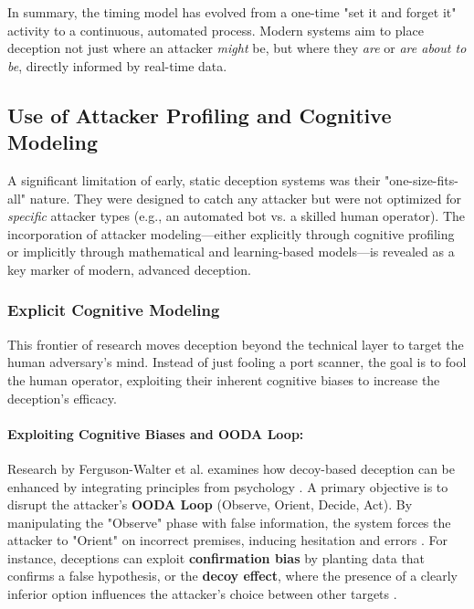 In summary, the timing model has evolved from a one-time "set it and forget it" activity to a continuous,
automated process. Modern systems aim to place deception not just where an attacker \textit{might} be, but
where they \textit{are} or \textit{are about to be}, directly informed by real-time data.

\subsection{Use of Attacker Profiling and Cognitive Modeling}\label{cognitive modeling}

A significant limitation of early, static deception systems was their "one-size-fits-all" nature. They were
designed to catch any attacker but were not optimized for \textit{specific} attacker types (e.g., an automated
bot vs. a skilled human operator). The incorporation of attacker modeling—either explicitly through
cognitive profiling or implicitly through mathematical and learning-based models—is revealed as a key
marker of modern, advanced deception.

\subsubsection{Explicit Cognitive Modeling}

This frontier of research moves deception beyond the technical layer to target the human adversary's mind.
Instead of just fooling a port scanner, the goal is to fool the human operator, exploiting their inherent
cognitive biases to increase the deception's efficacy.

\paragraph{Exploiting Cognitive Biases and OODA Loop:} Research by Ferguson-Walter et al. examines how
decoy-based deception can be enhanced by integrating principles from psychology \cite{ferguson2021examining}.
A primary objective is to disrupt the attacker's \textbf{OODA Loop} (Observe, Orient, Decide, Act).
By manipulating the "Observe" phase with false information, the system forces the attacker to "Orient"
on incorrect premises, inducing hesitation and errors \cite{ferguson2021examining}. For instance, deceptions
can exploit \textbf{confirmation bias} by planting data that confirms a false hypothesis, or the
\textbf{decoy effect}, where the presence of a clearly inferior option influences the attacker's choice
between other targets \cite{ferguson2021examining}.

